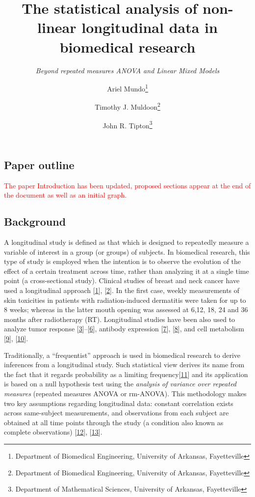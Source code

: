 \documentclass[
]{article}
\title{\textbf{The statistical analysis of non-linear longitudinal data in
biomedical research}}
\subtitle{\emph{Beyond repeated measures ANOVA and Linear Mixed Models}}
\author{Ariel Mundo\footnote{Department of Biomedical Engineering, University of
  Arkansas, Fayetteville} \and Timothy J. Muldoon\footnote{Department of Biomedical Engineering,
  University of Arkansas, Fayetteville} \and John R. Tipton\footnote{Department of Mathematical Sciences, University
  of Arkansas, Fayetteville}}
\date{}
\begin{document}
\maketitle

\hypertarget{paper-outline}{%
\subsection{Paper outline}\label{paper-outline}}

{\textcolor{red}{The paper Introduction has been updated, proposed sections appear at the end of the document as well as an initial graph.}}

\hypertarget{background}{%
\subsection{Background}\label{background}}

A longitudinal study is defined as that which is designed to repeatedly
measure a variable of interest in a group (or groups) of subjects. In
biomedical research, this type of study is employed when the intention
is to observe the evolution of the effect of a certain treatment across
time, rather than analyzing it at a single time point (a cross-sectional
study). Clinical studies of breast and neck cancer have used a
longitudinal approach {[}\protect\hyperlink{ref-sio2016}{1}{]},
{[}\protect\hyperlink{ref-kamstra2015}{2}{]}. In the first case, weekly
measurements of skin toxicities in patients with radiation-induced
dermatitis were taken for up to 8 weeks; whereas in the latter mouth
opening was assessed at 6,12, 18, 24 and 36 months after radiotherapy
(RT). Longitudinal studies have been also used to analyze tumor response
{[}\protect\hyperlink{ref-roblyer2011}{3}{]}--{[}\protect\hyperlink{ref-demidov2018}{6}{]},
antibody expression {[}\protect\hyperlink{ref-ritter2001}{7}{]},
{[}\protect\hyperlink{ref-roth2017}{8}{]}, and cell metabolism
{[}\protect\hyperlink{ref-jones2018}{9}{]},
{[}\protect\hyperlink{ref-skala2010}{10}{]}.

Traditionally, a ``frequentist'' approach is used in biomedical research
to derive inferences from a longitudinal study. Such statistical view
derives its name from the fact that it regards probability as a limiting
frequency{[}\protect\hyperlink{ref-wagenmakers2008}{11}{]} and its
application is based on a null hypothesis test using the \emph{analysis
of variance over repeated measures} (repeated measures ANOVA or
rm-ANOVA). This methodology makes two key assumptions regarding
longitudinal data: constant correlation exists across same-subject
measurements, and observations from each subject are obtained at all
time points through the study (a condition also known as complete
observations) {[}\protect\hyperlink{ref-gueorguieva2004}{12}{]},
{[}\protect\hyperlink{ref-schober2018}{13}{]}.
\end{document}
